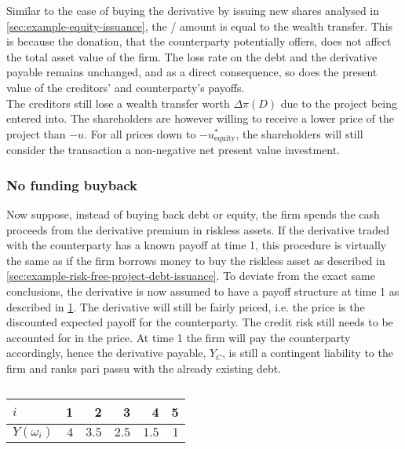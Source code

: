 \documentclass[../main.tex]{subfiles}
\begin{document}
            Similar to the case of buying the derivative by issuing new shares analysed in \cref{sec:example-equity-issuance},
            the \FVA/ amount is equal to the wealth transfer.
            This is because the donation,
            that the counterparty potentially offers,
            does not affect the total asset value of the firm.
            The loss rate on the debt and the derivative payable remains unchanged,
            and as a direct consequence,
            so does the present value of the creditors' and counterparty's payoffs.
            \\
            The creditors still lose a wealth transfer worth $\Delta \pi(D)$ due to the project being entered into.
            The shareholders are however willing to receive a lower price of the project than $-u$.
            For all prices down to $-u_{\text{equity}}^{\ast}$,
            the shareholders will still consider the transaction a non-negative net present value investment.

        \subsubsection{No funding buyback}
            Now suppose, instead of buying back debt or equity, 
            the firm spends the cash proceeds from the derivative premium in riskless assets. 
            If the derivative traded with the counterparty has a known payoff at time 1, this procedure is virtually the same as if the firm borrows money to buy the riskless asset 
            as described in \cref{sec:example-risk-free-project-debt-issuance}. 
            To deviate from the exact same conclusions, the derivative is now assumed to have a payoff structure at time 1 
            as described in \cref{tbl:risky-option-payoff}. 
            The derivative will still be fairly priced, i.e. the price is the discounted expected payoff for the counterparty. 
            The credit risk still needs to be accounted for in the price. 
            At time 1 the firm will pay the counterparty accordingly, hence the derivative payable, $Y_C$, 
            is still a contingent liability to the firm and ranks pari passu with the already existing debt.
            
            \begin{table}[H]
                \centering
                \begin{tabular}{l|rrrrr}
                    $i$ & 1 & 2 & 3 & 4 & 5 \\
                    \hline
                    $Y(\omega_{i})$ & $\num{4}$ & $\num{3.5}$ & $\num{2.5}$ & $\num{1.5}$ & $\num{1}$ \\
                \end{tabular}
                \caption{}
                \label{tbl:risky-option-payoff}
            \end{table}
\end{document}
